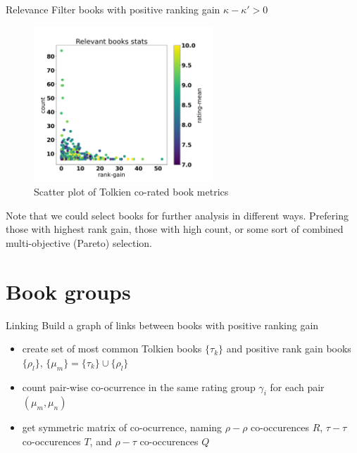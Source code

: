 \documentclass[9pt]{beamer}
\begin{document}
\begin{frame}{Relevance}
	Filter books with positive ranking gain $\kappa - \kappa' > 0$
	\begin{figure}
		\centering
		\includegraphics[width=0.6\textwidth]{../img/rank-scatter.png}
		\caption{Scatter plot of Tolkien co-rated book metrics}
	\end{figure}
	Note that we could select books for further analysis in different ways. Prefering those with highest rank gain, those with high count, or some sort of combined multi-objective (Pareto) selection.
\end{frame}

\section{Book groups}

\begin{frame}{Linking}
	Build a graph of links between books with positive ranking gain
	\begin{itemize}
		\item create set of most common Tolkien books $\{\tau_k\}$ and positive rank gain books $\{\rho_l\}$, $\{\mu_m\}=\{\tau_k\}\cup\{\rho_l\}$
		\item count pair-wise co-ocurrence in the same rating group $\gamma_i$ for each pair $(\mu_m,\mu_n)$
		\item get symmetric matrix of co-ocurrence, naming $\rho{-}\rho$ co-occurences $R$, $\tau{-}\tau$ co-occurences $T$, and $\rho{-}\tau$ co-occurences $Q$
	\end{itemize}
\end{frame}
\end{document}
